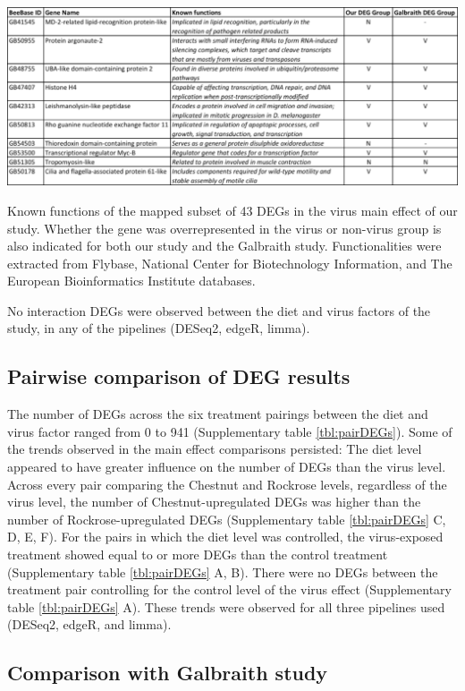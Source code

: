 \documentclass[11pt,a4paper,oldfontcommands,openany]{memoir}
\numberwithin{equation}{section} %
\begin{document}
\begin{table}[H]
  \includegraphics[width=\textwidth]{Images/virusGenes}
  \caption{Known functions of the mapped subset of 43 DEGs in the virus main effect of our study. Whether the gene was overrepresented in the virus or non-virus group is also indicated for both our study and the Galbraith study. Functionalities were extracted from Flybase, National Center for Biotechnology Information, and The European Bioinformatics Institute databases.}
  \label{tbl:virusGenes}
\end{table}

No interaction DEGs were observed between the diet and virus factors of the study, in any of the pipelines (DESeq2, edgeR, limma).

\subsection{Pairwise comparison of DEG results}

The number of DEGs across the six treatment pairings between the diet and virus factor ranged from 0 to 941 (Supplementary table \ref{tbl:pairDEGs}). Some of the trends observed in the main effect comparisons persisted: The diet level appeared to have greater influence on the number of DEGs than the virus level. Across every pair comparing the Chestnut and Rockrose levels, regardless of the virus level, the number of Chestnut-upregulated DEGs was higher than the number of Rockrose-upregulated DEGs (Supplementary table \ref{tbl:pairDEGs} C, D, E, F). For the pairs in which the diet level was controlled, the virus-exposed treatment showed equal to or more DEGs than the control treatment (Supplementary table \ref{tbl:pairDEGs} A, B). There were no DEGs between the treatment pair controlling for the control level of the virus effect (Supplementary table \ref{tbl:pairDEGs} A). These trends were observed for all three pipelines used (DESeq2, edgeR, and limma). 

\subsection{Comparison with Galbraith study}
\end{document}
